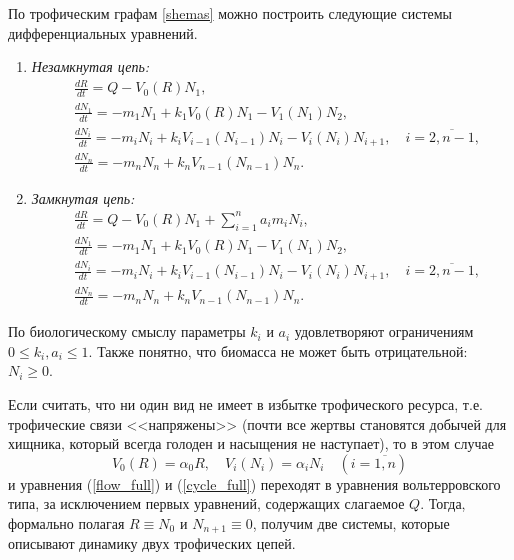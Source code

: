 По трофическим графам \ref{shemas} можно построить следующие системы дифференциальных уравнений. 

\begin{enumerate}[label={\asbuk*)}, ref=\asbuk*]
    \item \textit{Незамкнутая цепь:}
    \begin{equation}  \label{flow_full}
        \begin{split}
            & \frac{dR}{dt} = Q - V_0(R) N_1, \\
            & \frac{dN_1}{dt} = -m_1 N_1 + k_1 V_0(R) N_1 - V_1(N_1) N_2, \\
            & \frac{dN_i}{dt} = -m_i N_i + k_i V_{i-1}(N_{i-1}) N_i - V_i(N_i) N_{i+1}, \quad i=\overline{2,n-1}, \\
            & \frac{dN_n}{dt} = -m_n N_n + k_n V_{n-1}(N_{n-1}) N_n.
        \end{split}
    \end{equation}

    \item \textit{Замкнутая цепь:}
    \begin{equation} \label{cycle_full}
        \begin{split}
            & \frac{dR}{dt} = Q - V_0(R) N_1  + \sum_{i=1}^{n} a_i m_i N_i, \\
            & \frac{dN_1}{dt} = -m_1 N_1 + k_1 V_0(R) N_1 - V_1(N_1) N_2, \\
            & \frac{dN_i}{dt} = -m_i N_i + k_i V_{i-1}(N_{i-1}) N_i - V_i(N_i) N_{i+1}, \quad i=\overline{2,n-1}, \\
            & \frac{dN_n}{dt} = -m_n N_n + k_n V_{n-1}(N_{n-1}) N_n.
        \end{split}
    \end{equation}
\end{enumerate}

По биологическому смыслу параметры $k_i$ и $a_i$ удовлетворяют ограничениям $ 0 \leq k_i, a_i \leq 1 $. Также понятно, что биомасса не может быть отрицательной: \(N_i \geq 0\).

Если считать, что ни один вид не имеет в избытке трофического ресурса, т.е. трофические связи <<напряжены>> (почти все жертвы становятся добычей для хищника, который всегда голоден и насыщения не наступает), то в этом случае
\begin{equation}
    V_0(R) = \alpha_0 R, \quad V_i(N_i) = \alpha_i N_i \quad (i=\overline{1,n})
\end{equation}
и уравнения (\ref{flow_full}) и (\ref{cycle_full}) переходят в уравнения вольтерровского типа, за исключением первых уравнений, содержащих слагаемое \(Q\). Тогда, формально полагая \(R \equiv N_0\) и \( N_{n+1} \equiv 0 \), получим две системы, которые описывают динамику двух трофических цепей.  


